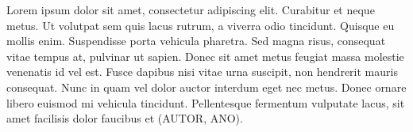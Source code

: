 
\vspace*{\fill}

Lorem ipsum dolor sit amet, consectetur adipiscing elit. Curabitur et neque metus. Ut volutpat sem quis lacus rutrum, a viverra odio tincidunt. Quisque eu mollis enim. Suspendisse porta vehicula pharetra. Sed magna risus, consequat vitae tempus at, pulvinar ut sapien. Donec sit amet metus feugiat massa molestie venenatis id vel est. Fusce dapibus nisi vitae urna suscipit, non hendrerit mauris consequat. Nunc in quam vel dolor auctor interdum eget nec metus. Donec ornare libero euismod mi vehicula tincidunt. Pellentesque fermentum vulputate lacus, sit amet facilisis dolor faucibus et (\MakeUppercase{autor}, ANO).